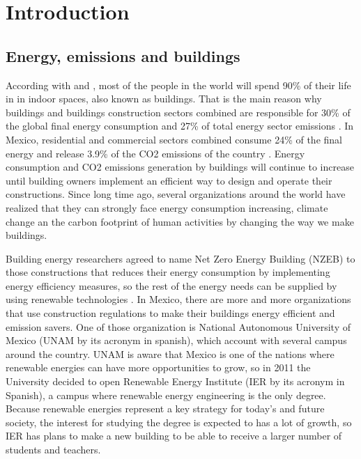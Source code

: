 
\chapter{Introduction}
\label{chap:introduccion}


\section{Energy, emissions and buildings}

According with \citet{klepeis2001national} and \citet{world2014combined}, most of the people in the world will spend 90\% of their life in in indoor spaces, also known as buildings. That is the main reason why buildings and buildings construction sectors combined are responsible for 30\% of the global final energy consumption and 27\% of total energy sector emissions \citep{iea-2022}. In Mexico, residential and commercial sectors combined consume 24\% of the final energy \citep{sener-2022} and release 3.9\% of the CO2 emissions of the country \citep{mexico2015inventario}. Energy consumption and CO2 emissions generation by buildings will continue to increase until building owners implement an efficient way to design and operate their constructions. Since long time ago, several organizations around the world have realized that they can strongly face energy consumption increasing, climate change an the carbon footprint of human activities by changing the way we make buildings.

Building energy researchers agreed to name Net Zero Energy Building (NZEB) to those constructions that reduces their energy consumption by implementing energy efficiency measures, so the rest of the energy needs can be supplied by using renewable technologies \citep{torcellini2006zero}. In Mexico, there are more and more organizations that use construction regulations to make their buildings energy efficient and emission savers. One of those organization is National Autonomous University of Mexico (UNAM by its acronym in spanish), which account with several campus around the country. UNAM is aware that Mexico is one of the nations where renewable energies can have more opportunities to grow, so in 2011 the University decided to open Renewable Energy Institute (IER by its acronym in Spanish), a campus where  renewable energy engineering is the only degree. Because renewable energies represent a key strategy for today's and future society, the interest for studying the degree is expected to has a lot of growth, so IER has plans to make a new building to be able to receive a larger number of students and teachers. 


